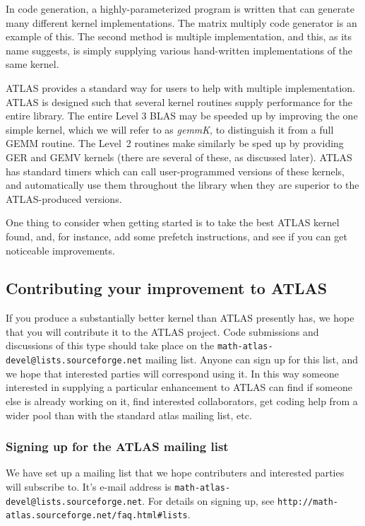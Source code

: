 \documentclass[11pt]{article}
\newcommand{\Wskip}[1]{ }
\begin{document}
In code generation, a highly-parameterized program is written that can
generate many different kernel implementations.  The matrix multiply
code generator is an example of this.  The second method is multiple
implementation, and this, as its name suggests, is simply supplying
various hand-written implementations of the same kernel.

ATLAS provides a standard way for users to help with multiple
implementation.  ATLAS is designed such that several kernel routines
supply performance for the entire library.  The entire Level 3 BLAS
may be speeded up by improving the one simple kernel, which we will
refer to as {\it gemmK}, to distinguish it from a full GEMM routine.
The Level~2 routines make similarly be sped up by providing GER and
GEMV kernels (there are several of these, as discussed later).
ATLAS has standard
timers which can call user-programmed versions of these kernels, and
automatically use them throughout the library when they are superior
to the ATLAS-produced versions.

One thing to consider when getting started is to take the best ATLAS kernel
found, and, for instance, add some prefetch instructions, and see if you
can get noticeable improvements.

\subsection{Contributing your improvement to ATLAS}

If you produce a substantially better kernel than ATLAS presently has, we hope
that you will contribute it to the ATLAS project.  Code submissions and 
discussions of this type should take place on the 
{\tt math-atlas-devel@lists.sourceforge.net}
mailing list.  Anyone can sign up for this list, and we hope that interested
parties will correspond using it.  In this way someone interested in supplying
a particular enhancement to ATLAS can find if someone else is already working
on it, find interested collaborators, get coding help from a wider pool than
with the standard atlas mailing list, etc.

\subsubsection{Signing up for the ATLAS mailing list}
We have set up a mailing list that we hope contributers and interested
parties will subscribe to.  It's e-mail address is 
{\tt math-atlas-devel@lists.sourceforge.net}.  For details on signing up, see
{\verb+http://math-atlas.sourceforge.net/faq.html#lists+}.
\Wskip
{
We have set up a mailing list that we hope contributers and interested
parties will subscribe to, {\tt atlas-comm@cs.utk.edu}.  The regular
ATLAS mailing list, {\tt atlas@cs.utk.edu}, is a fixed mailing list, 
whose recipients are limited to the UTK contingent of the ATLAS project.
On the other hand, {\tt atlas-comm@cs.utk.edu}, is a dynamic list, that
users can subscribe and unsubscribe to at will.

To subscribe to this mailing list, send mail to {\tt majordomo@cs.utk.edu},
and include the line {\tt subscribe atlas-comm} as the only body to the 
message.  Unsubscribing is accomplished by sending {\tt unsubscribe atlas-comm}
instead.
}
\end{document}
